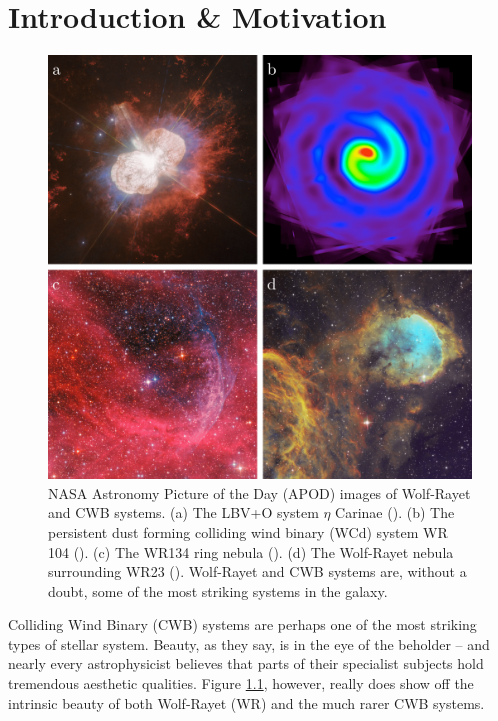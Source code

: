 \chapter{Introduction \& Motivation}

\begin{figure}[H]
  \centering
  \includegraphics[width=5in]{assets/wolf-rayets/wolf-rayets.png}
  \caption[NASA APOD images of Wolf-Rayet and CWB systems]{NASA Astronomy Picture of the Day (APOD) images of Wolf-Rayet and CWB systems. (a) The LBV+O system $\eta$ Carinae (). (b) The persistent dust forming colliding wind binary (WCd) system WR 104 (). (c) The WR134 ring nebula (). (d) The Wolf-Rayet nebula surrounding WR23 (). Wolf-Rayet and CWB systems are, without a doubt, some of the most striking systems in the galaxy.}
  \label{fig:cwbexamples}
\end{figure}

Colliding Wind Binary (CWB) systems are perhaps one of the most striking types of stellar system.
Beauty, as they say, is in the eye of the beholder -- and nearly every astrophysicist believes that parts of their specialist subjects hold tremendous aesthetic qualities.
Figure \ref{fig:cwbexamples}, however, really does show off the intrinsic beauty of both Wolf-Rayet (WR) and the much rarer CWB systems.

